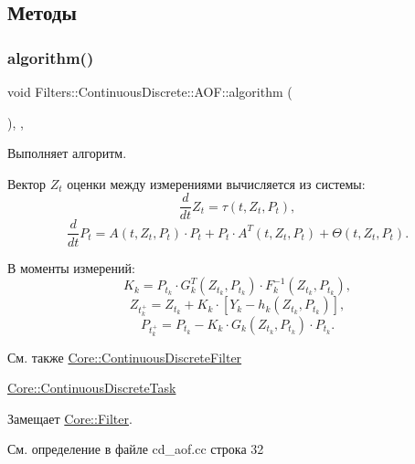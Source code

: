 \subsection{Методы}
\hypertarget{class_filters_1_1_continuous_discrete_1_1_a_o_f_a050849ffe1ada992988218805721914d}{}\label{class_filters_1_1_continuous_discrete_1_1_a_o_f_a050849ffe1ada992988218805721914d} 
\subsubsection{\texorpdfstring{algorithm()}{algorithm()}}
{\footnotesize\ttfamily void Filters\+::\+Continuous\+Discrete\+::\+A\+O\+F\+::algorithm (\begin{DoxyParamCaption}{ }\end{DoxyParamCaption})\hspace{0.3cm}{\ttfamily [override]}, {\ttfamily [protected]}, {\ttfamily [virtual]}}



Выполняет алгоритм. 

Вектор $Z_t$ оценки между измерениями вычисляется из системы\+: \[\frac{d}{dt}Z_t = \tau(t,Z_t, P_t),\] \[\frac{d}{dt}P_t = A(t,Z_t, P_t) \cdot P_t + P_t \cdot A^T(t,Z_t, P_t) + \Theta(t,Z_t,P_t).\]

В моменты измерений\+: \[K_k = P_{t_k} \cdot G_k^T(Z_{t_k}, P_{t_k}) \cdot F_k^{-1}(Z_{t_k}, P_{t_k}),\] \[Z_{t_k^+} = Z_{t_k} + K_k \cdot [Y_k - h_k(Z_{t_k}, P_{t_k})],\] \[P_{t_k^+} = P_{t_k} - K_k \cdot G_k(Z_{t_k},P_{t_k}) \cdot P_{t_k}.\]

\begin{DoxySeeAlso}{См. также}
\hyperlink{class_core_1_1_continuous_discrete_filter}{Core\+::\+Continuous\+Discrete\+Filter} 

\hyperlink{class_core_1_1_continuous_discrete_task}{Core\+::\+Continuous\+Discrete\+Task} 
\end{DoxySeeAlso}


Замещает \hyperlink{class_core_1_1_filter_a438681ee3e54aba2148042d9f8011ab8}{Core\+::\+Filter}.



См. определение в файле cd\+\_\+aof.\+cc строка 32

\hypertarget{class_filters_1_1_continuous_discrete_1_1_a_o_f_ab350a4de87a9e2c2e8b01e178d61f3b5}{}\label{class_filters_1_1_continuous_discrete_1_1_a_o_f_ab350a4de87a9e2c2e8b01e178d61f3b5} 
